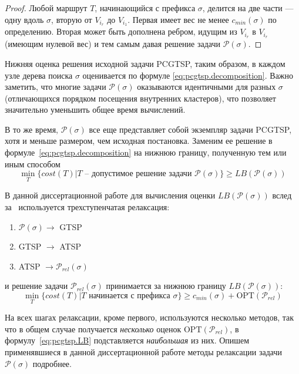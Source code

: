 \begin{proof}
  Любой маршрут $T$,
  начинающийся с префикса $\sigma$,
  делится на две части ---
  одну вдоль $\sigma$,
  вторую от $V_{i_r}$ до ${V_{i_1}}$.
  Первая имеет вес не менее $c_{min}(\sigma)$
  по определению.
  Вторая может быть дополнена ребром,
  идущим из $V_{i_r}$ в ${V_{i_r}}$
  (имеющим нулевой вес)
  и тем самым давая решение задачи
  $\mathcal P(\sigma)$.
\end{proof}

Нижняя оценка решения исходной задачи PCGTSP,
таким образом,
в каждом узле дерева поиска
$\sigma$
оценивается по формуле \eqref{eq:pcgtsp.decomposition}.
Важно заметить,
что многие задачи $\mathcal  P(\sigma)$
оказываются идентичными для разных $\sigma$
(отличающихся порядком посещения внутренних кластеров),
что позволяет значительно уменьшить общее время вычислений.

В то же время,
$\mathcal P(\sigma)$
все еще представляет собой экземпляр
задачи PCGTSP,
хотя и меньше размером,
чем исходная постановка.
Заменим ее решение в формуле~\eqref{eq:pcgtsp.decomposition}
на нижнюю границу,
полученную тем или иным способом
$$
\min_{T}\{cost(T)| T \text{ -- допустимое решение задачи } \mathcal P(\sigma)\}
\geqslant LB(\mathcal P(\sigma))
$$

В данной диссертационной работе для вычисления оценки
$LB(\mathcal P(\sigma))$
вслед за~\cite{SALMAN2020163}
используется трехступенчатая релаксация:
\begin{enumerate}
  \item $\mathcal P(\sigma) \to$ GTSP
  \item GTSP $\to$ ATSP
  \item ATSP $\to \mathcal P_{rel}(\sigma)$
\end{enumerate}
и решение задачи $\mathcal P_{rel}(\sigma)$
принимается за нижнюю границу
$LB(\mathcal P(\sigma))$:
\begin{equation}
  \label{eq:pcgtsp.LB}
  \min_T \{cost(T)| T \text{ начинается с префикса } \sigma\}
  \geqslant
  c_{min}(\sigma) + \mathrm{OPT}(\mathcal P_{rel})
\end{equation}

На всех шагах релаксации,
кроме первого,
используются несколько методов,
так что в общем случае получается \textit{несколько}
оценок
$\mathrm{OPT}(\mathcal P_{rel})$,
в формулу~\eqref{eq:pcgtsp.LB}
подставляется \textit{наибольшая} из них.
Опишем применявшиеся в данной диссертационной работе
методы релаксации задачи
$\mathcal P(\sigma)$
подробнее.

